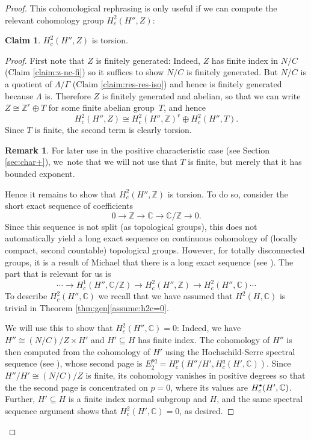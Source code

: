 \documentclass[JEP,XML,SOM,Unicode,published]{cedram}
\newcommand{\cbullet}{{\raisebox{1pt}{$\scriptscriptstyle\bullet$}}}
\newcommand{\bbC}{\ensuremath{\mathbb{C}}}
\newcommand{\bbZ}{\ensuremath{\mathbb{Z}}}
\theoremstyle{definition}
\newtheorem{rem}[thm]{Remark}
\newtheorem{claim}[thm]{Claim}
\begin{document}
\begin{proof}
This cohomological rephrasing is only useful if we can compute the relevant cohomology group $H^2_c(H'',Z)$:

\begin{claim}\label{claim:h2-tor}
$H^2_c(H'',Z)$ is torsion.
\end{claim}
\begin{proof} First note that $Z$ is finitely generated: Indeed, $Z$ has finite index in $N/C$ (Claim \ref{claim:z-nc-fi}) so it suffices to show $N/C$ is finitely generated. But $N/C$ is a quotient of $\Lambda/\Gamma$ (Claim \ref{claim:res-res-iso}) and hence is finitely generated because $\Lambda$ is. Therefore $Z$ is finitely generated and abelian, so that we can write $Z\cong \bbZ^r \oplus T$ for some finite abelian group~$T$, and hence
\[
H^2_c(H'',Z)\cong H^2_c(H'',\bbZ)^r \oplus H^2_c(H'',T).
\]
Since $T$ is finite, the second term is clearly torsion.
\begin{rem} For later use in the positive characteristic case (see Section \ref{sec:char+}), we~note that we will not use that $T$ is finite, but merely that it has bounded exponent. \end{rem}
Hence it remains to show that $H^2_c(H'',\bbZ)$ is torsion. To do so, consider the short exact sequence of coefficients
\begin{equation}\label{eq:ses-coeff}
0\to \bbZ\to \bbC\to \bbC/\bbZ\to 0.
\end{equation}
Since this sequence is not split (as topological groups), this does not automatically yield a long exact sequence on continuous cohomology of (locally compact, second countable) topological groups. However, for totally disconnected groups, it is a result of Michael that there is a long exact sequence (see \cite[Th.\,M]{wigner-cohomology}). The part that is relevant for us is
\begin{equation}\label{eq:les-coeff}
\cdots \to H^1_c(H'',\bbC/\bbZ)\to H^2_c(H'',\bbZ)\to H^2_c(H'',\bbC) \cdots
\end{equation}
To describe $H^2_c(H'',\bbC)$ we recall that we have assumed that $H^2(H,\bbC)$ is trivial in
Theorem \ref{thm:gen}\eqref{assume:h2c=0}.

We will use this to show that $H^2_c(H'',\bbC)=0$: Indeed, we have $H''\cong (N/C)/Z\times H'$ and $H'\subseteq H$ has finite index. The cohomology of $H''$ is then computed from the cohomology of $H'$ using the Hochschild-Serre spectral sequence (see \cite[Prop.\,5]{casselman-wigner}), whose second page is $E_2^{pq}=H^p_c(H''/H', H^q_c(H',\bbC))$. Since $H''/H'\cong (N/C)/Z$ is finite, its cohomology vanishes in positive degrees so that the the second page is concentrated on $p=0$, where its values are $H^\cbullet_c(H',\bbC)$. Further, $H'\subseteq H$ is a finite index normal subgroup and $H$,
and the same spectral sequence argument shows that $H^2_c(H',\bbC)=0$, as desired.


\end{proof}
\end{proof}
\end{document}
